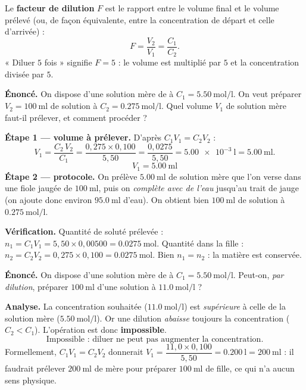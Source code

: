 \documentclass[11pt,a4paper]{article}
\begin{document}
\begin{definition}
Le \textbf{facteur de dilution} $F$ est le rapport entre le volume final et le volume prélevé (ou, de
façon équivalente, entre la concentration de départ et celle d'arrivée) :
\[ F = \frac{V_2}{V_1} = \frac{C_1}{C_2}. \]
« Diluer $5$ fois » signifie $F = 5$ : le volume est multiplié par $5$ et la concentration divisée
par $5$.
\end{definition}

\begin{exemple}\label{ex:dil}
\textbf{Énoncé.} On dispose d'une solution mère de  à $C_1 = \SI{5.50}{\mole\per\litre}$.
On veut préparer $V_2 = \SI{100}{\milli\litre}$ de solution à $C_2 = \SI{0.275}{\mole\per\litre}$.
Quel volume $V_1$ de solution mère faut-il prélever, et comment procéder ?

\smallskip
\textbf{Étape 1 — volume à prélever.} D'après $C_1V_1 = C_2V_2$ :
\[ V_1 = \frac{C_2\,V_2}{C_1} = \frac{0{,}275 \times 0{,}100}{5{,}50}
       = \frac{0{,}0275}{5{,}50} = \SI{5.00e-3}{\litre} = \SI{5.00}{\milli\litre}. \]
\[ \boxed{V_1 = \SI{5.00}{\milli\litre}} \]
\textbf{Étape 2 — protocole.} On prélève \textbf{$\SI{5.00}{\milli\litre}$} de solution mère que l'on
verse dans une fiole jaugée de $\SI{100}{\milli\litre}$, puis on \emph{complète avec de l'eau} jusqu'au
trait de jauge (on ajoute donc environ $\SI{95.0}{\milli\litre}$ d'eau). On obtient bien
$\SI{100}{\milli\litre}$ de solution à $\SI{0.275}{\mole\per\litre}$.

\smallskip
\textbf{Vérification.} Quantité de soluté prélevée : $n_1 = C_1V_1 = 5{,}50\times 0{,}00500
= \SI{0.0275}{\mole}$. Quantité dans la fille : $n_2 = C_2V_2 = 0{,}275\times 0{,}100 = \SI{0.0275}{\mole}$.
Bien $n_1 = n_2$ : la matière est conservée.
\end{exemple}

\begin{exemple}
\textbf{Énoncé.} On dispose d'une solution mère de  à $C_1 = \SI{5.50}{\mole\per\litre}$.
Peut-on, \emph{par dilution}, préparer $\SI{100}{\milli\litre}$ d'une solution à $\SI{11.0}{\mole\per\litre}$ ?

\smallskip
\textbf{Analyse.} La concentration souhaitée ($\SI{11.0}{\mole\per\litre}$) est \emph{supérieure} à
celle de la solution mère ($\SI{5.50}{\mole\per\litre}$). Or une dilution \emph{abaisse} toujours la
concentration ($C_2 < C_1$). L'opération est donc \textbf{impossible}.
\[ \boxed{\text{Impossible : diluer ne peut pas augmenter la concentration.}} \]
Formellement, $C_1V_1 = C_2V_2$ donnerait $V_1 = \dfrac{11{,}0\times 0{,}100}{5{,}50} = \SI{0.200}{\litre}
= \SI{200}{\milli\litre}$ : il faudrait prélever $\SI{200}{\milli\litre}$ de mère pour préparer
$\SI{100}{\milli\litre}$ de fille, ce qui n'a aucun sens physique.
\end{exemple}
\end{document}
